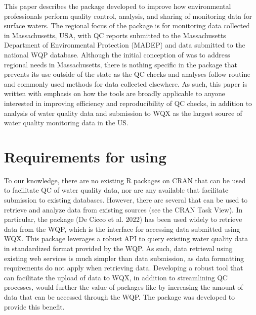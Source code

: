 This paper describes the  package developed to improve how environmental professionals perform quality control, analysis, and sharing of monitoring data for surface waters. The regional focus of the package is for monitoring data collected in Massachusetts, USA, with QC reports submitted to the Massachusetts Department of Environmental Protection (MADEP) and data submitted to the national WQP database. Although the initial conception of  was to address regional needs in Massachusetts, there is nothing specific in the package that prevents its use outside of the state as the QC checks and analyses follow routine and commonly used methods for data collected elsewhere. As such, this paper is written with emphasis on how the tools are broadly applicable to anyone interested in improving efficiency and reproducibility of QC checks, in addition to analysis of water quality data and submission to WQX as the largest source of water quality monitoring data in the US.

\hypertarget{requirements-for-using}{%
\section{\texorpdfstring{Requirements for using }{Requirements for using }}\label{requirements-for-using}}

To our knowledge, there are no existing R packages on CRAN that can be used to facilitate QC of water quality data, nor are any available that facilitate submission to existing databases. However, there are several that can be used to retrieve and analyze data from existing sources (see the CRAN  Task View). In particular, the  package (De Cicco et al. 2022) has been used widely to retrieve data from the WQP, which is the interface for accessing data submitted using WQX. This package leverages a robust API to query existing water quality data in standardized format provided by the WQP. As such, data retrieval using existing web services is much simpler than data submission, as data formatting requirements do not apply when retrieving data. Developing a robust tool that can facilitate the upload of data to WQX, in addition to streamlining QC processes, would further the value of packages like  by increasing the amount of data that can be accessed through the WQP. The  package was developed to provide this benefit.

